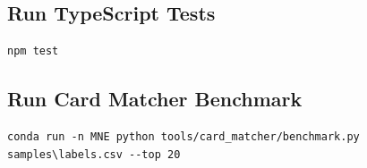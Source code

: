 \documentclass[11pt,a4paper]{article}
\begin{document}
\subsection{Run TypeScript Tests}

\begin{lstlisting}
npm test
\end{lstlisting}

\subsection{Run Card Matcher Benchmark}

\begin{lstlisting}
conda run -n MNE python tools/card_matcher/benchmark.py samples\labels.csv --top 20
\end{lstlisting}
\end{document}
